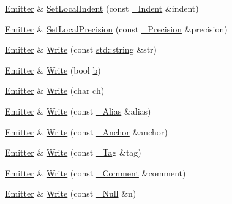 \begin{DoxyCompactItemize}
\item 
\mbox{\hyperlink{class_y_a_m_l_1_1_emitter}{Emitter}} \& \mbox{\hyperlink{class_y_a_m_l_1_1_emitter_a483fff51e136ff84274c645d7f212f4b}{Set\+Local\+Indent}} (const \mbox{\hyperlink{struct_y_a_m_l_1_1___indent}{\+\_\+\+Indent}} \&indent)
\item 
\mbox{\hyperlink{class_y_a_m_l_1_1_emitter}{Emitter}} \& \mbox{\hyperlink{class_y_a_m_l_1_1_emitter_a308004f77e3a2662379143a4eeabe9c3}{Set\+Local\+Precision}} (const \mbox{\hyperlink{struct_y_a_m_l_1_1___precision}{\+\_\+\+Precision}} \&precision)
\item 
\mbox{\hyperlink{class_y_a_m_l_1_1_emitter}{Emitter}} \& \mbox{\hyperlink{class_y_a_m_l_1_1_emitter_afabf2909ddfbbb793420a2e94b50f45e}{Write}} (const \mbox{\hyperlink{glad_8h_ac83513893df92266f79a515488701770}{std\+::string}} \&str)
\item 
\mbox{\hyperlink{class_y_a_m_l_1_1_emitter}{Emitter}} \& \mbox{\hyperlink{class_y_a_m_l_1_1_emitter_a2296002f7510291dbce7ce87589f1e7d}{Write}} (bool \mbox{\hyperlink{glad_8h_a6eba317e3cf44d6d26c04a5a8f197dcb}{b}})
\item 
\mbox{\hyperlink{class_y_a_m_l_1_1_emitter}{Emitter}} \& \mbox{\hyperlink{class_y_a_m_l_1_1_emitter_ab197c8f2c8bfee2ee7545af7e6843b3e}{Write}} (char ch)
\item 
\mbox{\hyperlink{class_y_a_m_l_1_1_emitter}{Emitter}} \& \mbox{\hyperlink{class_y_a_m_l_1_1_emitter_a3fc3c5296d272b6d51943a76ea8ad341}{Write}} (const \mbox{\hyperlink{struct_y_a_m_l_1_1___alias}{\+\_\+\+Alias}} \&alias)
\item 
\mbox{\hyperlink{class_y_a_m_l_1_1_emitter}{Emitter}} \& \mbox{\hyperlink{class_y_a_m_l_1_1_emitter_ae0fea8f4ea8bae14d7cb044154a1f80e}{Write}} (const \mbox{\hyperlink{struct_y_a_m_l_1_1___anchor}{\+\_\+\+Anchor}} \&anchor)
\item 
\mbox{\hyperlink{class_y_a_m_l_1_1_emitter}{Emitter}} \& \mbox{\hyperlink{class_y_a_m_l_1_1_emitter_ae28cf87092e7b34641887a41e068da79}{Write}} (const \mbox{\hyperlink{struct_y_a_m_l_1_1___tag}{\+\_\+\+Tag}} \&tag)
\item 
\mbox{\hyperlink{class_y_a_m_l_1_1_emitter}{Emitter}} \& \mbox{\hyperlink{class_y_a_m_l_1_1_emitter_a7683ef422503881a0db4d77fad2b1c37}{Write}} (const \mbox{\hyperlink{struct_y_a_m_l_1_1___comment}{\+\_\+\+Comment}} \&comment)
\item 
\mbox{\hyperlink{class_y_a_m_l_1_1_emitter}{Emitter}} \& \mbox{\hyperlink{class_y_a_m_l_1_1_emitter_a4cdef3d2d2bf7999595371f2cc89322e}{Write}} (const \mbox{\hyperlink{struct_y_a_m_l_1_1___null}{\+\_\+\+Null}} \&n)

\end{DoxyCompactItemize}
